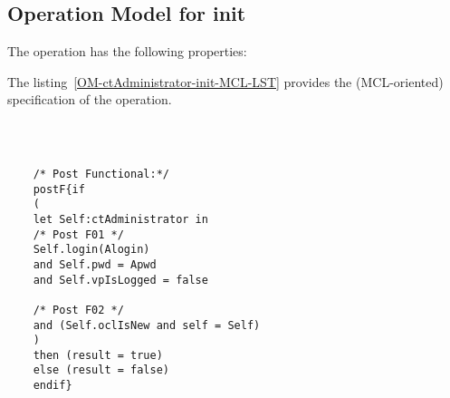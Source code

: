 \subsection{Operation Model for init}

\label{OM-init}


The  operation has the following properties:

	\begin{operationmodel}



		


	\end{operationmodel}



	\vspace{1cm}
	The listing~\ref{OM-ctAdministrator-init-MCL-LST} provides the \msrmessir (MCL-oriented) specification of the operation.
	
	\scriptsize
	\vspace{0.5cm}
	\begin{lstlisting}[style=MessirStyle,firstnumber=auto,captionpos=b,caption={\msrmessir (MCL-oriented) specification of the operation \emph{init}.},label=OM-ctAdministrator-init-MCL-LST]

	
	
	/* Post Functional:*/ 
	postF{if
	(
	let Self:ctAdministrator in
	/* Post F01 */
	Self.login(Alogin)
	and Self.pwd = Apwd
	and Self.vpIsLogged = false
	
	/* Post F02 */
	and (Self.oclIsNew and self = Self)
	)
	then (result = true)
	else (result = false)
	endif}
	
	
	\end{lstlisting}
	\normalsize 
	
	
	
	





